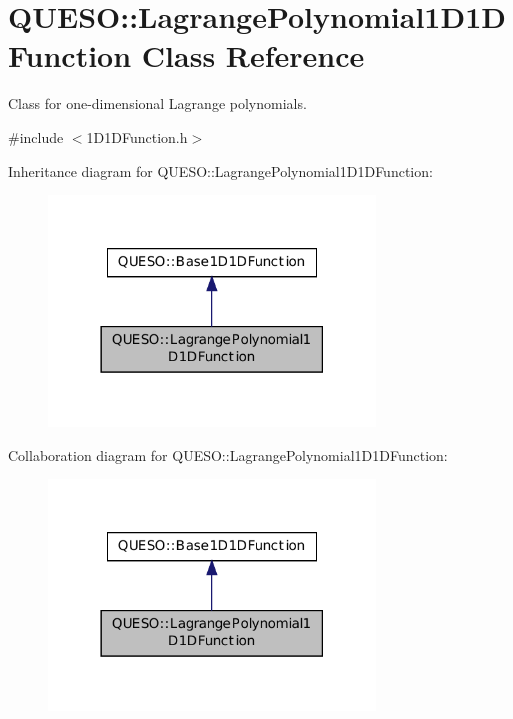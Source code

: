 \hypertarget{class_q_u_e_s_o_1_1_lagrange_polynomial1_d1_d_function}{\section{Q\-U\-E\-S\-O\-:\-:Lagrange\-Polynomial1\-D1\-D\-Function Class Reference}
\label{class_q_u_e_s_o_1_1_lagrange_polynomial1_d1_d_function}
}


Class for one-\/dimensional Lagrange polynomials.  




{\ttfamily \#include $<$1\-D1\-D\-Function.\-h$>$}



Inheritance diagram for Q\-U\-E\-S\-O\-:\-:Lagrange\-Polynomial1\-D1\-D\-Function\-:
\nopagebreak
\begin{figure}[H]
\begin{center}
\leavevmode
\includegraphics[width=246pt]{class_q_u_e_s_o_1_1_lagrange_polynomial1_d1_d_function__inherit__graph}
\end{center}
\end{figure}


Collaboration diagram for Q\-U\-E\-S\-O\-:\-:Lagrange\-Polynomial1\-D1\-D\-Function\-:
\nopagebreak
\begin{figure}[H]
\begin{center}
\leavevmode
\includegraphics[width=246pt]{class_q_u_e_s_o_1_1_lagrange_polynomial1_d1_d_function__coll__graph}
\end{center}
\end{figure}
